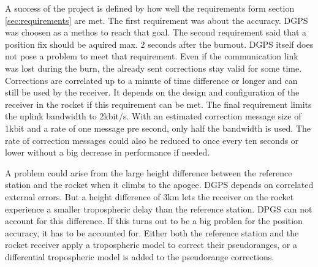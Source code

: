 A success of the project is defined by how well the requirements form section \ref{sec:requirements} are met.
The first requirement was about the accuracy.
DGPS was choosen as a methos to reach that goal.
The second requirement said that a position fix should be aquired max. 2 seconds after the burnout.
DGPS itself does not pose a problem to meet that requirement.
Even if the communication link was lost during the burn, the already sent corrections stay valid for some time.
Corrections are correlated up to a minute of time difference or longer and can still be used by the receiver.
It depends on the design and configuration of the receiver in the rocket if this requirement can be met.
The final requirement limits the uplink bandwidth to 2kbit/s.
With an estimated correction message size of 1kbit and a rate of one message pre second, only half the bandwidth is used.
The rate of correction messages could also be reduced to once every ten seconds or lower without a big decrease in performance if needed.

A problem could arise from the large height difference between the reference station and the rocket when it climbs to the apogee.
DGPS depends on correlated external errors.
But a height difference of 3km lets the receiver on the rocket experience a smaller tropospheric delay than the reference station.
DPGS can not account for this difference.
If this turns out to be a big problen for the position accuracy, it has to be accounted for.
Either both the reference station and the rocket receiver apply a tropospheric model to correct their pseudoranges, or a differential tropospheric model is added to the pseudorange corrections.